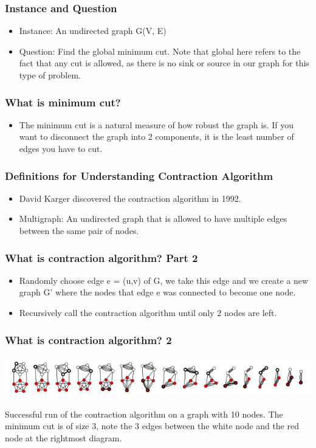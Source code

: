 \documentclass{beamer}
\begin{document}
\begin{frame}
\frametitle{Instance and Question}
\begin{itemize}
		\item Instance: An undirected graph G(V, E)
		\item Question: Find the global minimum cut. Note that global here refers to the fact that any cut is allowed, as there is no sink or source in our graph for this type of problem.
\end{itemize}
\end{frame}

\begin{frame}
\frametitle{What is minimum cut?}
\begin{itemize}
		\item The minimum cut is a natural measure of how robust the graph is. If you want to disconnect the graph into 2 components, it is the least number of edges you have to cut.
\end{itemize}
\end{frame}

\begin{frame}
\frametitle{Definitions for Understanding Contraction Algorithm}
\begin{itemize}
	\item David Karger discovered the contraction algorithm in 1992.
	\item Multigraph: An undirected graph that is allowed to have multiple edges between the same pair of nodes.
\end{itemize}
\end{frame}

\begin{frame}
\frametitle{What is contraction algorithm? Part 2}
\begin{itemize}
	\item Randomly choose edge e = (u,v) of G, we take this edge and we create a new graph G' where the nodes that edge e was connected to become one node. 
	\item Recursively call the contraction algorithm until only 2 nodes are left. 
	
\end{itemize}
\end{frame}


\begin{frame}
\frametitle{What is contraction algorithm? 2}
\includegraphics[scale=0.5]{kargers_diagram}

Successful run of the contraction algorithm on a graph with 10 nodes.  The minimum cut is of size 3, note the 3 edges between the white node and the red node at the rightmost diagram.
\end{frame}
\end{document}
